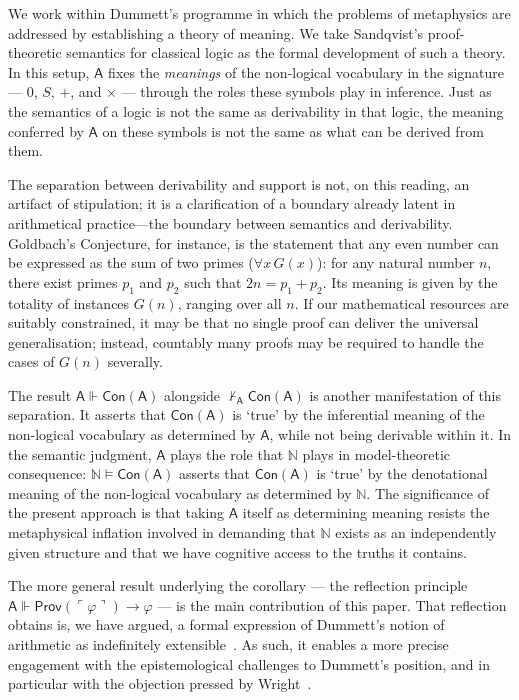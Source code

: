 \documentclass[reqno]{asl}
\renewcommand{\phi}{\varphi}
\newcommand{\pa}{\textsf{A}}
\newcommand{\Prov}{\textsf{Prov}}
\newcommand{\Con}{\textsf{Con}}
\begin{document}
We work within Dummett's programme in which the problems of metaphysics are
addressed by establishing a theory of meaning. We take Sandqvist's
proof-theoretic semantics for classical logic as the formal development of such
a theory. In this setup, $\pa$ fixes the \emph{meanings} of the non-logical
vocabulary in the signature --- $0$, $S$, $+$, and $\times$ --- through the roles
these symbols play in inference. Just as the semantics of a logic is not the
same as derivability in that logic, the meaning conferred by $\pa$ on these
symbols is not the same as what can be derived from them.

The separation between derivability and support is not, on this reading, an
artifact of stipulation; it is a clarification of a boundary already latent in
arithmetical practice---the boundary between semantics and derivability.
Goldbach's Conjecture, for instance, is the statement that any even number can
be expressed as the sum of two primes ($\forall x\, G(x)$): for any natural
number $n$, there exist primes $p_1$ and $p_2$ such that $2n = p_1 + p_2$. Its
meaning is given by the totality of instances $G(n)$, ranging over all $n$. If
our mathematical resources are suitably constrained, it may be that no single
proof can deliver the universal generalisation; instead, countably many proofs
may be required to handle the cases of $G(n)$ severally.

The result $\pa \Vdash \Con(\pa)$ alongside $\not\vdash_{\pa} \Con(\pa)$ is
another manifestation of this separation. It asserts that $\Con(\pa)$ is
`true' by the inferential meaning of the non-logical vocabulary as determined
by $\pa$, while not being derivable within it. In the semantic judgment, $\pa$
plays the role that $\mathbb{N}$ plays in model-theoretic consequence:
$\mathbb{N} \models \Con(\pa)$ asserts that $\Con(\pa)$ is `true' by the
denotational meaning of the non-logical vocabulary as determined by
$\mathbb{N}$. The significance of the present approach is that taking $\pa$
itself as determining meaning resists the metaphysical inflation involved in
demanding that $\mathbb{N}$ exists as an independently given structure and that
we have cognitive access to the truths it contains.

The more general result underlying the corollary --- the reflection principle
$\pa \Vdash \Prov(\ulcorner \phi \urcorner) \to \phi$ --- is the main
contribution of this paper. That reflection obtains is, we have argued, a
formal expression of Dummett's notion of arithmetic as indefinitely
extensible~\cite{dummett1963}. As such, it enables a more precise engagement
with the epistemological challenges to Dummett's position, and in particular
with the objection pressed by Wright~\cite{wright1994}.
\end{document}
